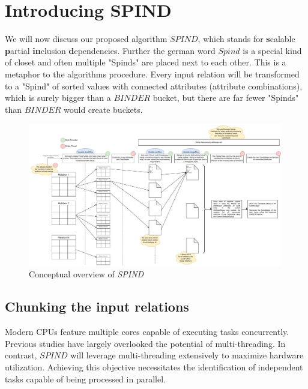 \section{Introducing SPIND}

We will now discuss our proposed algorithm $SPIND$, which stands for \textbf{s}calable \textbf{p}artial \textbf{in}clusion \textbf{d}ependencies. Further the german word $Spind$ is a special kind of closet and often multiple "Spinds" are placed next to each other. This is a metaphor to the algorithms procedure. Every input relation will be transformed to a "Spind" of sorted values with connected attributes (attribute combinations), which is surely bigger than a $BINDER$ bucket, but there are far fewer "Spinds" than $BINDER$ would create buckets.

\begin{figure}[h]
    \centering
    \includegraphics[width=0.99\textwidth]{files/SPIND.pdf}
    \caption{Conceptual overview of \textit{SPIND}}
    \label{fig:spind}
\end{figure}

\subsection{Chunking the input relations}
Modern CPUs feature multiple cores capable of executing tasks concurrently. Previous studies have largely overlooked the potential of multi-threading. In contrast, $SPIND$ will leverage multi-threading extensively to maximize hardware utilization. Achieving this objective necessitates the identification of independent tasks capable of being processed in parallel. \\

